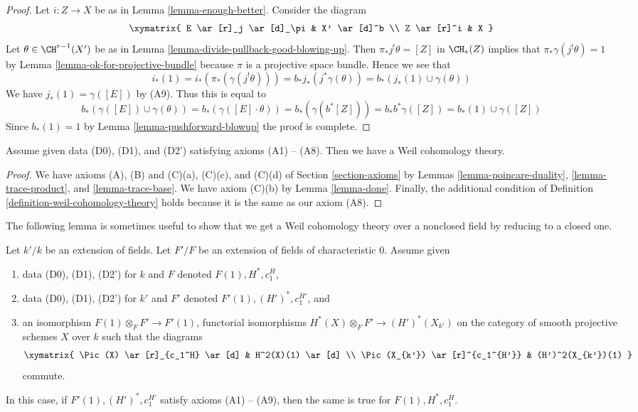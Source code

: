 \begin{proof}
Let $i : Z \to X$ be as in Lemma \ref{lemma-enough-better}. Consider
the diagram
$$
\xymatrix{
E \ar[r]_j \ar[d]_\pi & X' \ar[d]^b \\
Z \ar[r]^i & X
}
$$
Let $\theta \in \CH^{r - 1}(X')$ be as in
Lemma \ref{lemma-divide-pullback-good-blowing-up}.
Then $\pi_*j^!\theta = [Z]$ in $\CH_*(Z)$ implies that
$\pi_*\gamma(j^!\theta) = 1$ by Lemma \ref{lemma-ok-for-projective-bundle}
because $\pi$ is a projective space bundle.
Hence we see that
$$
i_*(1) = i_*(\pi_*(\gamma(j^!\theta))) =
b_*j_*(j^*\gamma(\theta)) =
b_*(j_*(1) \cup \gamma(\theta))
$$
We have $j_*(1) = \gamma([E])$ by (A9). Thus this is equal to
$$
b_*(\gamma([E]) \cup \gamma(\theta)) =
b_*(\gamma([E] \cdot \theta)) =
b_*(\gamma(b^*[Z])) =
b_*b^*\gamma([Z]) = b_*(1) \cup \gamma([Z])
$$
Since $b_*(1) = 1$ by Lemma \ref{lemma-pushforward-blowup} the
proof is complete.
\end{proof}

\begin{proposition}
\label{proposition-get-weil}
Assume given data (D0), (D1), and (D2') satisfying axioms (A1) -- (A8).
Then we have a Weil cohomology theory.
\end{proposition}

\begin{proof}
We have axioms (A), (B) and (C)(a), (C)(c), and (C)(d) of
Section \ref{section-axioms} by
Lemmas \ref{lemma-poincare-duality}, \ref{lemma-trace-product}, and
\ref{lemma-trace-base}.
We have axiom (C)(b) by
Lemma \ref{lemma-done}.
Finally, the additional condition of
Definition \ref{definition-weil-cohomology-theory}
holds because it is the same as our axiom (A8).
\end{proof}

\noindent
The following lemma is sometimes useful to show that we get a
Weil cohomology theory over a nonclosed field by reducing to a
closed one.

\begin{lemma}
\label{lemma-check-over-extension}
Let $k'/k$ be an extension of fields. Let $F'/F$ be an extension
of fields of characteristic $0$. Assume given
\begin{enumerate}
\item data (D0), (D1), (D2') for $k$ and $F$ denoted
$F(1), H^*, c_1^H$,
\item data (D0), (D1), (D2') for $k'$ and $F'$ denoted
$F'(1), (H')^*, c_1^{H'}$, and
\item an isomorphism $F(1) \otimes_F F' \to F'(1)$, functorial isomorphisms
$H^*(X) \otimes_F F' \to (H')^*(X_{k'})$ on the category of smooth projective
schemes $X$ over $k$ such that the diagrams
$$
\xymatrix{
\Pic(X) \ar[r]_{c_1^H} \ar[d] & H^2(X)(1) \ar[d] \\
\Pic(X_{k'}) \ar[r]^{c_1^{H'}} & (H')^2(X_{k'})(1)
}
$$
commute.
\end{enumerate}
In this case, if $F'(1), (H')^*, c_1^{H'}$ satisfy axioms (A1) -- (A9),
then the same is true for $F(1), H^*, c_1^H$.
\end{lemma}

